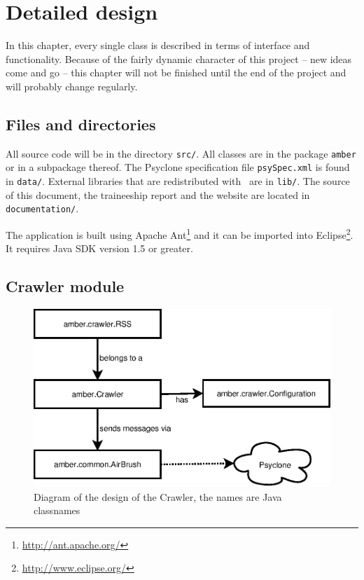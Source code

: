 \chapter{Detailed design}

In this chapter, every single class is described in terms of interface and
functionality. Because of the fairly dynamic character of this project -- new
ideas come and go -- this chapter will not be finished until the end of the
project and will probably change regularly.

\section{Files and directories}

All source code will be in the directory \texttt{src/}. All classes are in the
package \texttt{amber} or in a subpackage thereof. The Psyclone specification
file \texttt{psySpec.xml} is found in \texttt{data/}. External libraries that
are redistributed with \Amber\ are in \texttt{lib/}. The source of this
document, the traineeship report and the website are located in
\texttt{documentation/}.

The application is built using Apache
Ant\footnote{\url{http://ant.apache.org/}} and it can be imported into
Eclipse\footnote{\url{http://www.eclipse.org/}}. It requires Java SDK version
1.5 or greater.

\section{Crawler module}

\begin{figure}
  \centering
  \includegraphics{image/crawler}
  \caption{
    Diagram of the design of the Crawler, the names are Java classnames
  }
\end{figure}


